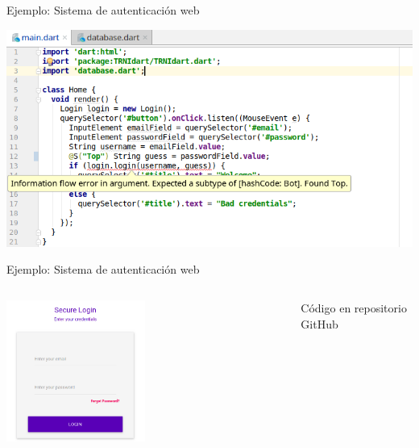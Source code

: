 \documentclass[aspectratio=169,10pt]{beamer}
\begin{document}
\begin{frame}[fragile]{Ejemplo: Sistema de autenticación web}
	\begin{center}
		\includegraphics[width=1.0\textwidth]{images/html3.png}
	\end{center}
\end{frame}
%


\begin{frame}[fragile]{Ejemplo: Sistema de autenticación web}
	\begin{columns}[T,onlytextwidth]
		\begin{center}
			\includegraphics[width=0.5\textwidth]{images/screen4.png}
		\end{center}
		\vspace{2cm}
		Código en repositorio GitHub~\cite{repotest}
	\end{columns}

\end{frame}
\end{document}
